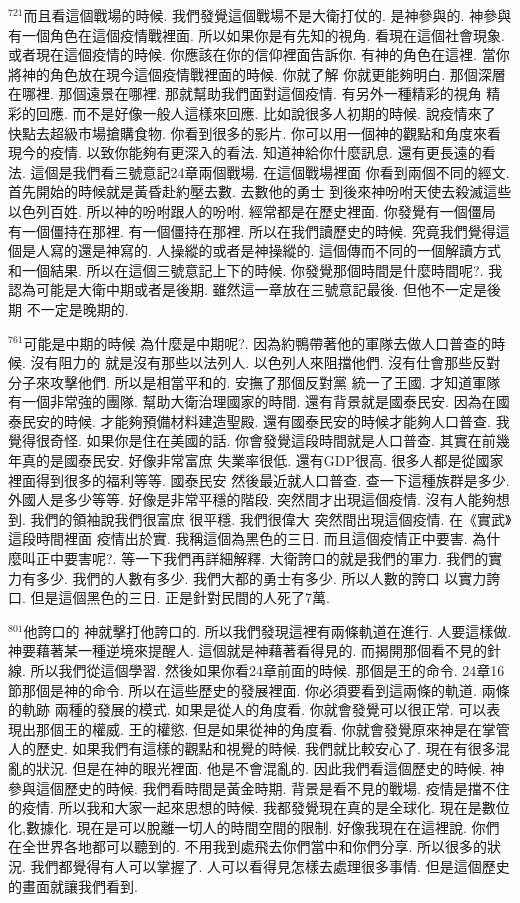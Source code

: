 \documentclass{book}
\begin{document}
$^{721}$而且看這個戰場的時候.
我們發覺這個戰場不是大衛打仗的.
是神參與的.
神參與 有一個角色在這個疫情戰裡面.
所以如果你是有先知的視角.
看現在這個社會現象.
或者現在這個疫情的時候.
你應該在你的信仰裡面告訴你.
有神的角色在這裡.
當你將神的角色放在現今這個疫情戰裡面的時候.
你就了解 你就更能夠明白.
那個深層在哪裡.
那個遠景在哪裡.
那就幫助我們面對這個疫情.
有另外一種精彩的視角 精彩的回應.
而不是好像一般人這樣來回應.
比如說很多人初期的時候.
說疫情來了 快點去超級市場搶購食物.
你看到很多的影片.
你可以用一個神的觀點和角度來看現今的疫情.
以致你能夠有更深入的看法.
知道神給你什麼訊息.
還有更長遠的看法.
這個是我們看三號意記24章兩個戰場.
在這個戰場裡面 你看到兩個不同的經文.
首先開始的時候就是黃昏赴約壓去數.
去數他的勇士 到後來神吩咐天使去殺滅這些以色列百姓.
所以神的吩咐跟人的吩咐.
經常都是在歷史裡面.
你發覺有一個僵局 有一個僵持在那裡.
有一個僵持在那裡.
所以在我們讀歷史的時候.
究竟我們覺得這個是人寫的還是神寫的.
人操縱的或者是神操縱的.
這個傳而不同的一個解讀方式和一個結果.
所以在這個三號意記上下的時候.
你發覺那個時間是什麼時間呢?.
我認為可能是大衛中期或者是後期.
雖然這一章放在三號意記最後.
但他不一定是後期 不一定是晚期的.

$^{761}$可能是中期的時候 為什麼是中期呢?.
因為約鴨帶著他的軍隊去做人口普查的時候.
沒有阻力的 就是沒有那些以法列人.
以色列人來阻擋他們.
沒有仕會那些反對分子來攻擊他們.
所以是相當平和的.
安撫了那個反對黨 統一了王國.
才知道軍隊有一個非常強的團隊.
幫助大衛治理國家的時間.
還有背景就是國泰民安.
因為在國泰民安的時候.
才能夠預備材料建造聖殿.
還有國泰民安的時候才能夠人口普查.
我覺得很奇怪.
如果你是住在美國的話.
你會發覺這段時間就是人口普查.
其實在前幾年真的是國泰民安.
好像非常富庶 失業率很低.
還有GDP很高.
很多人都是從國家裡面得到很多的福利等等.
國泰民安 然後最近就人口普查.
查一下這種族群是多少.
外國人是多少等等.
好像是非常平穩的階段.
突然間才出現這個疫情.
沒有人能夠想到.
我們的領袖說我們很富庶 很平穩.
我們很偉大 突然間出現這個疫情.
在《實武》這段時間裡面 疫情出於實.
我稱這個為黑色的三日.
而且這個疫情正中要害.
為什麼叫正中要害呢?.
等一下我們再詳細解釋.
大衛誇口的就是我們的軍力.
我們的實力有多少.
我們的人數有多少.
我們大都的勇士有多少.
所以人數的誇口 以實力誇口.
但是這個黑色的三日.
正是針對民間的人死了7萬.

$^{801}$他誇口的 神就擊打他誇口的.
所以我們發現這裡有兩條軌道在進行.
人要這樣做.
神要藉著某一種逆境來提醒人.
這個就是神藉著看得見的.
而揭開那個看不見的針線.
所以我們從這個學習.
然後如果你看24章前面的時候.
那個是王的命令.
24章16節那個是神的命令.
所以在這些歷史的發展裡面.
你必須要看到這兩條的軌道.
兩條的軌跡 兩種的發展的模式.
如果是從人的角度看.
你就會發覺可以很正常.
可以表現出那個王的權威.
王的權慾.
但是如果從神的角度看.
你就會發覺原來神是在掌管人的歷史.
如果我們有這樣的觀點和視覺的時候.
我們就比較安心了.
現在有很多混亂的狀況.
但是在神的眼光裡面.
他是不會混亂的.
因此我們看這個歷史的時候.
神參與這個歷史的時候.
我們看時間是黃金時期.
背景是看不見的戰場.
疫情是擋不住的疫情.
所以我和大家一起來思想的時候.
我都發覺現在真的是全球化.
現在是數位化,數據化.
現在是可以脫離一切人的時間空間的限制.
好像我現在在這裡說.
你們在全世界各地都可以聽到的.
不用我到處飛去你們當中和你們分享.
所以很多的狀況.
我們都覺得有人可以掌握了.
人可以看得見怎樣去處理很多事情.
但是這個歷史的畫面就讓我們看到.
\end{document}
